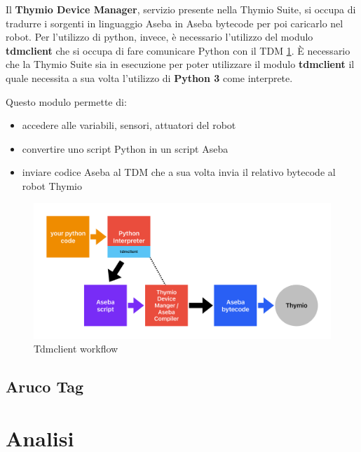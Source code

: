 \documentclass[12pt,a4paper,openright,twoside]{book}
\begin{document}
Il \textbf{Thymio Device Manager}, servizio presente nella Thymio Suite, si occupa di tradurre i sorgenti in linguaggio Aseba in Aseba bytecode per poi caricarlo nel robot. Per l'utilizzo di python, invece, è necessario l'utilizzo del modulo \textbf{tdmclient} che si occupa di fare comunicare Python con il \ac{TDM} \cref{fig:tdmclient}. È necessario che la Thymio Suite sia in esecuzione per poter utilizzare il modulo \textbf{tdmclient} il quale necessita a sua volta l'utilizzo di \textbf{Python 3} come interprete.

Questo modulo permette di:
\begin{itemize}
    \item accedere alle variabili, sensori, attuatori del robot
    \item convertire uno script Python in un script Aseba 
    \item inviare codice Aseba al \ac{TDM} che a sua volta invia il relativo bytecode al  robot Thymio 
\end{itemize}


\begin{figure}
    \centering
    \includegraphics[width=.8\linewidth]{figures/TDM.pdf}
    \caption{Tdmclient workflow}
    \label{fig:tdmclient}
\end{figure}



\section{Aruco Tag}

\chapter{Analisi}
\label{chap:analisi}
\end{document}
